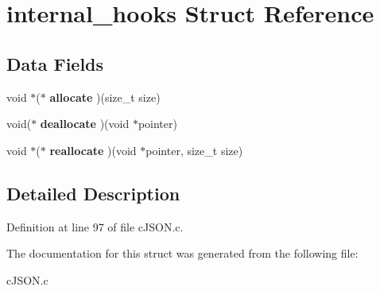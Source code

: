 \hypertarget{structinternal__hooks}{}\section{internal\+\_\+hooks Struct Reference}
\label{structinternal__hooks}
\subsection*{Data Fields}
\begin{DoxyCompactItemize}
\item 
\mbox{\label{structinternal__hooks_a4f765ac1a0e1e3f58d49c7abd211e0da}} 
void $\ast$($\ast$ {\bfseries allocate} )(size\+\_\+t size)
\item 
\mbox{\label{structinternal__hooks_a887c93b3f394f367ecfe7f839d35ca1e}} 
void($\ast$ {\bfseries deallocate} )(void $\ast$pointer)
\item 
\mbox{\label{structinternal__hooks_acb4baff89e1b2e26de89cd4cdd69c2b3}} 
void $\ast$($\ast$ {\bfseries reallocate} )(void $\ast$pointer, size\+\_\+t size)
\end{DoxyCompactItemize}


\subsection{Detailed Description}


Definition at line 97 of file c\+J\+S\+O\+N.\+c.



The documentation for this struct was generated from the following file\+:\begin{DoxyCompactItemize}
\item 
c\+J\+S\+O\+N.\+c\end{DoxyCompactItemize}
